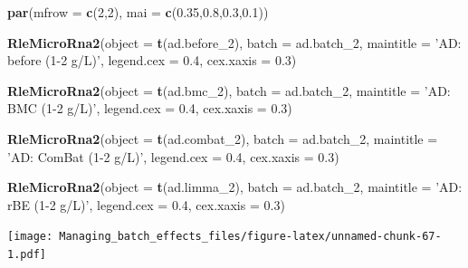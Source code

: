\documentclass[]{book}
\newenvironment{Shaded}{\begin{snugshade}}{\end{snugshade}}
\newcommand{\KeywordTok}[1]{\textcolor[rgb]{0.13,0.29,0.53}{\textbf{#1}}}
\newcommand{\DataTypeTok}[1]{\textcolor[rgb]{0.13,0.29,0.53}{#1}}
\newcommand{\DecValTok}[1]{\textcolor[rgb]{0.00,0.00,0.81}{#1}}
\newcommand{\FloatTok}[1]{\textcolor[rgb]{0.00,0.00,0.81}{#1}}
\newcommand{\StringTok}[1]{\textcolor[rgb]{0.31,0.60,0.02}{#1}}
\newcommand{\NormalTok}[1]{#1}
\begin{document}
\begin{Shaded}
\begin{Highlighting}[]
\KeywordTok{par}\NormalTok{(}\DataTypeTok{mfrow =} \KeywordTok{c}\NormalTok{(}\DecValTok{2}\NormalTok{,}\DecValTok{2}\NormalTok{), }\DataTypeTok{mai =} \KeywordTok{c}\NormalTok{(}\FloatTok{0.35}\NormalTok{,}\FloatTok{0.8}\NormalTok{,}\FloatTok{0.3}\NormalTok{,}\FloatTok{0.1}\NormalTok{))}

\KeywordTok{RleMicroRna2}\NormalTok{(}\DataTypeTok{object =} \KeywordTok{t}\NormalTok{(ad.before_}\DecValTok{2}\NormalTok{), }\DataTypeTok{batch =}\NormalTok{ ad.batch_}\DecValTok{2}\NormalTok{, }
             \DataTypeTok{maintitle =} \StringTok{'AD: before (1-2 g/L)'}\NormalTok{, }\DataTypeTok{legend.cex =} \FloatTok{0.4}\NormalTok{, }
             \DataTypeTok{cex.xaxis =} \FloatTok{0.3}\NormalTok{)}

\KeywordTok{RleMicroRna2}\NormalTok{(}\DataTypeTok{object =} \KeywordTok{t}\NormalTok{(ad.bmc_}\DecValTok{2}\NormalTok{), }\DataTypeTok{batch =}\NormalTok{ ad.batch_}\DecValTok{2}\NormalTok{, }
             \DataTypeTok{maintitle =} \StringTok{'AD: BMC (1-2 g/L)'}\NormalTok{, }\DataTypeTok{legend.cex =} \FloatTok{0.4}\NormalTok{, }
             \DataTypeTok{cex.xaxis =} \FloatTok{0.3}\NormalTok{)}

\KeywordTok{RleMicroRna2}\NormalTok{(}\DataTypeTok{object =} \KeywordTok{t}\NormalTok{(ad.combat_}\DecValTok{2}\NormalTok{), }\DataTypeTok{batch =}\NormalTok{ ad.batch_}\DecValTok{2}\NormalTok{, }
             \DataTypeTok{maintitle =} \StringTok{'AD: ComBat (1-2 g/L)'}\NormalTok{, }\DataTypeTok{legend.cex =} \FloatTok{0.4}\NormalTok{, }
             \DataTypeTok{cex.xaxis =} \FloatTok{0.3}\NormalTok{)}

\KeywordTok{RleMicroRna2}\NormalTok{(}\DataTypeTok{object =} \KeywordTok{t}\NormalTok{(ad.limma_}\DecValTok{2}\NormalTok{), }\DataTypeTok{batch =}\NormalTok{ ad.batch_}\DecValTok{2}\NormalTok{, }
             \DataTypeTok{maintitle =} \StringTok{'AD: rBE (1-2 g/L)'}\NormalTok{, }\DataTypeTok{legend.cex =} \FloatTok{0.4}\NormalTok{, }
             \DataTypeTok{cex.xaxis =} \FloatTok{0.3}\NormalTok{)}
\end{Highlighting}
\end{Shaded}

\texttt{[image: Managing\_batch\_effects\_files/figure-latex/unnamed-chunk-67-1.pdf]}
\end{document}

